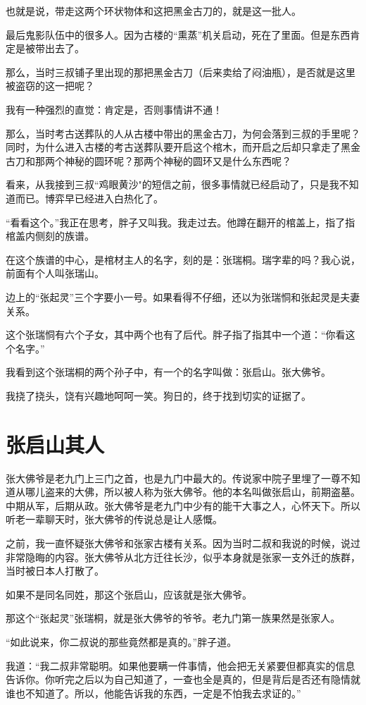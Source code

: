 也就是说，带走这两个环状物体和这把黑金古刀的，就是这一批人。

最后鬼影队伍中的很多人。因为古楼的“熏蒸”机关启动，死在了里面。但是东西肯定是被带出去了。

那么，当时三叔铺子里出现的那把黑金古刀（后来卖给了闷油瓶），是否就是这里被盗窃的这一把呢？

我有一种强烈的直觉：肯定是，否则事情讲不通！

那么，当时考古送葬队的人从古楼中带出的黑金古刀，为何会落到三叔的手里呢？同时，为什么进入古楼的考古送葬队要开启这个棺木，而开启之后却只拿走了黑金古刀和那两个神秘的圆环呢？那两个神秘的圆环又是什么东西呢？

看来，从我接到三叔“鸡眼黄沙"的短信之前，很多事情就已经启动了，只是我不知道而已。博弈早已经进入白热化了。

“看看这个。”我正在思考，胖子又叫我。我走过去。他蹲在翻开的棺盖上，指了指棺盖内侧刻的族谱。

在这个族谱的中心，是棺材主人的名字，刻的是：张瑞桐。瑞字辈的吗？我心说，前面有个人叫张瑞山。

边上的“张起灵”三个字要小一号。如果看得不仔细，还以为张瑞恫和张起灵是夫妻关系。

这个张瑞恫有六个子女，其中两个也有了后代。胖子指了指其中一个道：“你看这个名字。”

我看到这个张瑞桐的两个孙子中，有一个的名字叫做：张启山。张大佛爷。

我挠了挠头，饶有兴趣地呵呵一笑。狗日的，终于找到切实的证据了。

\chapter{张启山其人}

张大佛爷是老九门上三门之首，也是九门中最大的。传说家中院子里埋了一尊不知道从哪儿盗来的大佛，所以被人称为张大佛爷。他的本名叫做张启山，前期盗墓。中期从军，后期从政。张大佛爷是老九门中少有的能干大事之人，心怀天下。所以听老一辈聊天时，张大佛爷的传说总是让人感慨。

之前，我一直怀疑张大佛爷和张家古楼有关系。因为当时二叔和我说的时候，说过非常隐晦的内容。张大佛爷从北方迁往长沙，似乎本身就是张家一支外迁的族群，当时被日本人打散了。

如果不是同名同姓，那这个张启山，应该就是张大佛爷。

那这个“张起灵”张瑞桐，就是张大佛爷的爷爷。老九门第一族果然是张家人。

“如此说来，你二叔说的那些竟然都是真的。”胖子道。

我道：“我二叔非常聪明。如果他要瞒一件事情，他会把无关紧要但都真实的信息告诉你。你听完之后以为自己知道了，一查也全是真的，但是背后是否还有隐情就谁也不知道了。所以，他能告诉我的东西，一定是不怕我去求证的。”

